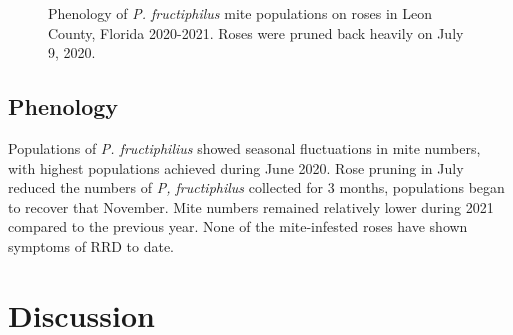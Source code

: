 \documentclass[12pt,final,CPage]{ufthesis}
\begin{document}
{\begin{figure}[h]
{  }

  \caption[Phenology of \textit{P. fructiphilus} mite populations on roses in Leon County, Florida]{Phenology of \textit{P. fructiphilus} mite populations on roses in Leon County, Florida 2020-2021. Roses were pruned back heavily on July 9, 2020.}\label{fig:pheno-graphs}
  \end{figure}
  \FloatBarrier

  \hypertarget{results-pheno}{%
  \subsection{Phenology}\label{results-pheno}}

  Populations of \emph{P. fructiphilius} showed seasonal fluctuations in mite numbers, with highest populations achieved during June 2020. Rose pruning in July reduced the numbers of \emph{P, fructiphilus} collected for 3 months, populations began to recover that November. Mite numbers remained relatively lower during 2021 compared to the previous year. None of the mite-infested roses have shown symptoms of RRD to date.

  \hypertarget{dis-survey-pheno}{%
  \section{Discussion}\label{dis-survey-pheno}}

}
\end{document}
